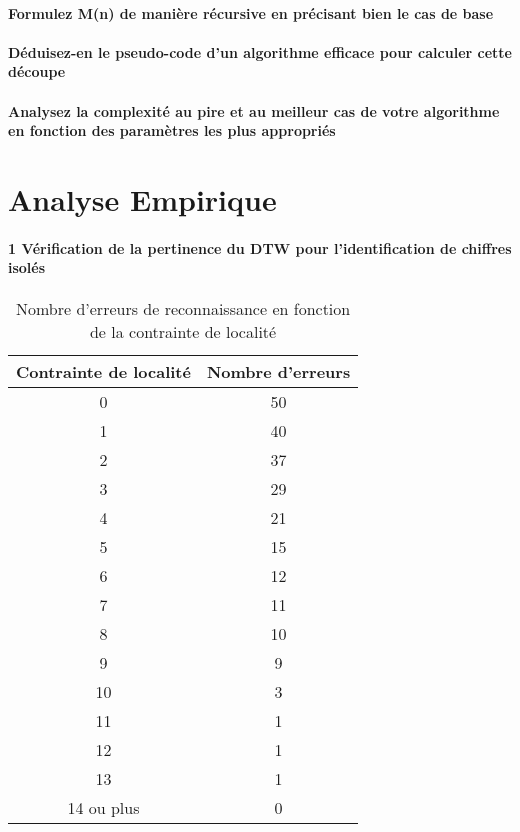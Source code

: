\documentclass[a4paper,11pt]{article}
\begin{document}
\subsection{Formulez M(n) de manière récursive en précisant bien le cas de base}

\subsection{Déduisez-en le pseudo-code d'un algorithme efficace pour calculer cette découpe}

\subsection{Analysez la complexité au pire et au meilleur cas de votre algorithme en fonction des paramètres les plus appropriés}

\part{Analyse Empirique}

\subsection*{1 Vérification de la pertinence du DTW pour l'identification de chiffres isolés}

\label{tableau}

\begin{center}


\begin{table}[H]

\begin{tabular}{|c|c|}

\hline
Contrainte de localité & Nombre d'erreurs \\
\hline
0 & 50 \\
\hline
1 & 40 \\
\hline
2 & 37 \\
\hline
3 & 29 \\
\hline
4 & 21 \\
\hline
5 & 15 \\
\hline
6 & 12 \\
\hline
7 & 11 \\
\hline
8 & 10 \\
\hline
9 & 9 \\
\hline
10 & 3 \\
\hline
11 & 1 \\
\hline
12 & 1 \\
\hline
13 & 1 \\
\hline
14 ou plus & 0 \\
\hline



\end{tabular}
\caption{Nombre d'erreurs de reconnaissance en fonction de la contrainte de localité\protect\footnotemark[2]}
 
\end{table}
\end{center}
\end{document}
